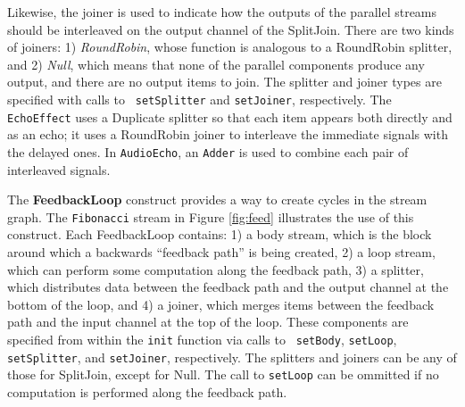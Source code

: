 Likewise, the joiner is used to indicate how the outputs of the parallel
streams should be interleaved on the output channel of the SplitJoin.
There are two kinds of joiners: 1) {\it RoundRobin}, whose function is
analogous to a RoundRobin splitter, and 2) {\it Null}, which means that
none of the parallel components produce any output, and there are no
output items to join.
The splitter and joiner types are specified with calls to {\tt
setSplitter} and {\tt setJoiner}, respectively.  The {\tt EchoEffect}
uses a Duplicate splitter so that each item appears both directly and as
an echo; it uses a RoundRobin joiner to interleave the immediate signals
with the delayed ones.  In {\tt AudioEcho}, an {\tt Adder} is used to
combine each pair of interleaved signals.

The {\bf FeedbackLoop} construct provides a way to create cycles in the
stream graph.  The {\tt Fibonacci} stream in Figure \ref{fig:feed}
illustrates the use of this construct.  Each FeedbackLoop contains: 1) a
body stream, which is the block around which a backwards ``feedback
path'' is being created, 2) a loop stream, which can perform some
computation along the feedback path, 3) a splitter, which distributes
data between the feedback path and the output channel at the bottom of
the loop, and 4) a joiner, which merges items between the feedback path
and the input channel at the top of the loop.  These components are
specified from within the {\tt init} function via calls to {\tt
setBody}, {\tt setLoop}, {\tt setSplitter}, and {\tt setJoiner},
respectively.
%
%
The splitters and joiners can be any of those for SplitJoin, except for
Null.  The call to {\tt setLoop} can be ommitted if no computation is
performed along the feedback path.

